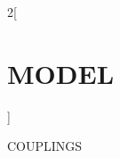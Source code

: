 \documentclass[11pt,twoside]{article}
\begin{document}
\begin{landscape}

\begin{minipage}{25cm}

\begin{large}
\begin{multicols}{2}[\section*{MODEL}]
\end{multicols}
\end{large}

\end{minipage}

\clearpage

\renewcommand{\arraystretch}{1.5}

COUPLINGS

\end{landscape}
\end{document}
